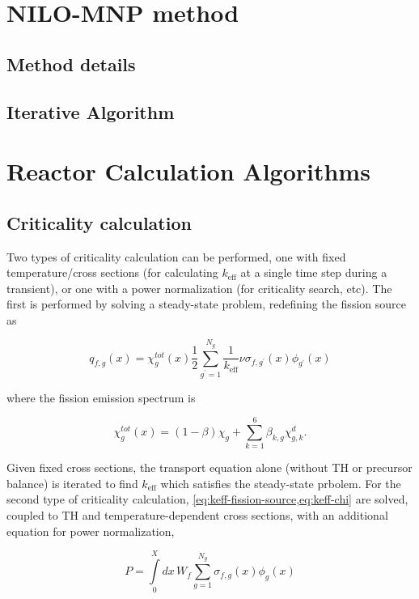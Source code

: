 \documentclass{proposal}
\newcommand{\p}{\ensuremath{^\prime}}
\newcommand{\keff}{\ensuremath{k_{\text{eff}}}}
\begin{document}
\section{NILO-MNP method}

\subsection{Method details}

\subsection{Iterative Algorithm}

\section{Reactor Calculation Algorithms}

\subsection{Criticality calculation}

Two types of criticality calculation can be performed, one with fixed temperature/cross sections (for calculating $\keff$ at a single time step during a transient), or one with a power normalization (for criticality search, etc). The first is performed by solving a steady-state problem, redefining the fission source as 

\begin{equation}\label{eq:keff-fission-source}
    q_{f, g}(x) = \chi_{g}^{tot}(x) \frac{1}{2}\sum_{g\p = 1}^{N_g} \frac{1}{\keff}\nu \sigma_{f, g\p}(x)\phi_{g\p}(x)
\end{equation}

where the fission emission spectrum is

\begin{equation}\label{eq:keff-chi}
    \chi_{g}^{tot}(x) = (1 -\beta)\chi_{g} + \sum_{k=1}^{6}\beta_{k, g}\chi_{g, k}^d.
\end{equation}

Given fixed cross sections, the transport equation alone (without TH or precursor balance) is iterated to find $\keff$ which satisfies the steady-state prbolem. For the second type of criticality calculation, \cref{eq:keff-fission-source,eq:keff-chi} are solved, coupled to TH and temperature-dependent cross sections, with an additional equation for power normalization,

\begin{equation}\label{eq:power-normalization}
    P = \int\limits_0^{X}dx\, W_f \sum_{g=1}^{N_g} \sigma_{f, g}(x)\phi_{g}(x)
\end{equation}
\end{document}
